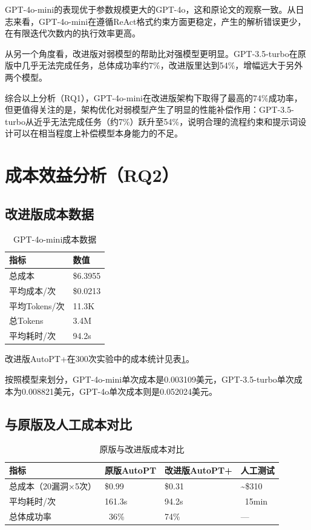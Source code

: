GPT-4o-mini的表现优于参数规模更大的GPT-4o，这和原论文\cite{Wu2024AutoPT}的观察一致。从日志来看，GPT-4o-mini在遵循ReAct格式约束方面更稳定，产生的解析错误更少，在有限迭代次数内的执行效率更高。

从另一个角度看，改进版对弱模型的帮助比对强模型更明显。GPT-3.5-turbo在原版中几乎无法完成任务，总体成功率约7\%，改进版里达到54\%，增幅远大于另外两个模型。

综合以上分析（RQ1），GPT-4o-mini在改进版架构下取得了最高的74\%成功率，但更值得关注的是，架构优化对弱模型产生了明显的性能补偿作用：GPT-3.5-turbo从近乎无法完成任务（约7\%）跃升至54\%，说明合理的流程约束和提示词设计可以在相当程度上补偿模型本身能力的不足。

\section{成本效益分析（RQ2）}

\subsection{改进版成本数据}

\begin{table}[htbp]
\centering
\caption{GPT-4o-mini成本数据} \label{tab:ch4:2}
  \renewcommand{\arraystretch}{1.3}
\begin{tabular}{ll}
    \toprule
指标 & 数值 \\
    \midrule
总成本 & \$6.3955 \\
    \midrule
平均成本/次 & \$0.0213 \\
    \midrule
平均Tokens/次 & 11.3K \\
    \midrule
总Tokens & 3.4M \\
    \midrule
平均耗时/次 & 94.2s \\
    \bottomrule
\end{tabular}
\end{table}

改进版AutoPT+在300次实验中的成本统计见表\ref{tab:ch4:2}。

按照模型来划分，GPT-4o-mini单次成本是0.003109美元，GPT-3.5-turbo单次成本为0.008821美元，GPT-4o单次成本则是0.052024美元。

\subsection{与原版及人工成本对比}

\begin{table}[htbp]
\centering
\caption{原版与改进版成本对比} \label{tab:ch4:3}
  \renewcommand{\arraystretch}{1.3}
\begin{tabular}{llll}
    \toprule
指标 & 原版AutoPT & 改进版AutoPT+ & 人工测试 \\
    \midrule
总成本（20漏洞×5次） & \$0.99 & \$0.31 & \textasciitilde\$310 \\
    \midrule
平均耗时/次 & 161.3s & 94.2s & ~15min \\
    \midrule
总体成功率 & ~36\% & 74\% & — \\
    \bottomrule
\end{tabular}
\end{table}

